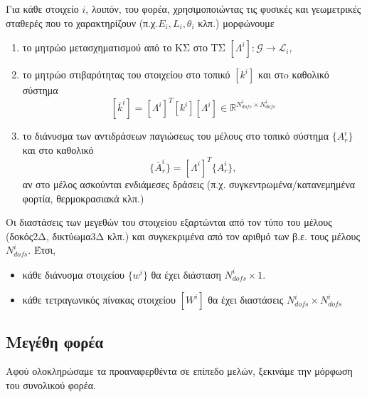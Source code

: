 \documentclass[a4paper, twocolumn]{article}
\newcommand{\num}[1]{ N_{\mathit{#1}} }
\newcommand{\gs}{\mathcal{G}}
\newcommand{\ls}{\mathcal{L}_i}
\newcommand{\vect}[1]{ \{ #1\} }
\newcommand{\mat}[1]{\left[ #1 \right]}
\newcommand{\gtol}{\mat{\Lambda^i}}
\newcommand{\lstiff}[1]{\mat{k^{\mathit{#1}}}}
\newcommand{\gstiff}[1]{\mat{\bar{k}^{\mathit{#1}}}}
\begin{document}
Για κάθε στοιχείο $i$, λοιπόν, του 
φορέα, χρησιμοποιώντας τις φυσικές και γεωμετρικές σταθερές που το 
χαρακτηρίζουν (π.χ.$E_i, L_i, \theta_i$ κλπ.) μορφώνουμε
\begin{enumerate}
	\item το μητρώο μετασχηματισμού από το ΚΣ στο ΤΣ
	$ \gtol: \gs \rightarrow \ls ,$
	\item το μητρώο στιβαρότητας του στοιχείου στο τοπικό 
	$\lstiff{i}$ και
 	στo καθολικό σύστημα
		\begin{equation}
			\gstiff i = \gtol^T \lstiff{i} \gtol \in 
			\mathbb{R}^{\num{dofs}^i \times \num{dofs}^i}
		\end{equation}

	\item το διάνυσμα των αντιδράσεων παγιώσεως του μέλους στο τοπικό 
	σύστημα $\vect{A_r^i} $ και στο καθολικό 
	\begin{equation}
		\vect{\bar A_r^i} = \gtol^T \vect{A_r^i},
	\end{equation}
	αν στο μέλος ασκούνται ενδιάμεσες δράσεις (π.χ. 
	συγκεντρωμένα/κατανεμημένα φορτία, θερμοκρασιακά κλπ.)

\end{enumerate}

Οι διαστάσεις των μεγεθών του στοιχείου 
εξαρτώνται από τον τύπο του 
μέλους (δοκός2Δ, δικτύωμα3Δ κλπ.) και συγκεκριμένα 
από τον αριθμό των β.ε. τους μέλους $\num{dofs}^i$. Έτσι, 
\begin{itemize}
	\item κάθε διάνυσμα στοιχείου $\vect{w^i}$ θα έχει διάσταση 
	$\num{dofs}^i \times 1$.
	\item κάθε τετραγωνικός πίνακας στοιχείου $\mat{W^i}$ θα έχει 
	διαστάσεις $\num{dofs}^i  \times \num{dofs}^i$
\end{itemize} 

\subsection{Μεγέθη φορέα}
Αφού ολοκληρώσαμε τα προαναφερθέντα σε επίπεδο μελών, ξεκινάμε την 
μόρφωση του συνολικού φορέα.
\end{document}
